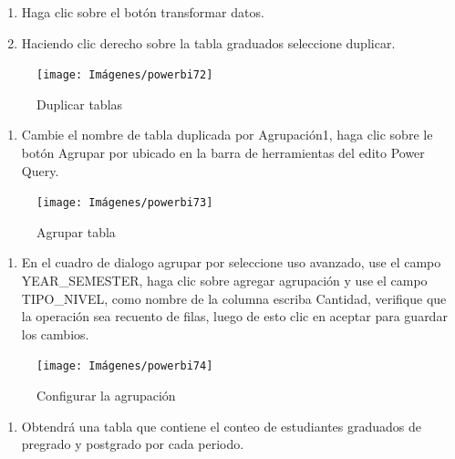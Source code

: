 \documentclass[
]{book}
\providecommand{\tightlist}{%
  \setlength{\itemsep}{0pt}\setlength{\parskip}{0pt}}
\begin{document}
\begin{enumerate}
\def\labelenumi{\arabic{enumi}.}
\item
  Haga clic sobre el botón transformar datos.
\item
  Haciendo clic derecho sobre la tabla graduados seleccione duplicar.
\end{enumerate}

\begin{figure}

{\centering \texttt{[image: Imágenes/powerbi72]} 

}

\caption{Duplicar tablas}\label{fig:paso2porcentajes-fig}
\end{figure}

\begin{enumerate}
\def\labelenumi{\arabic{enumi}.}
\setcounter{enumi}{2}
\tightlist
\item
  Cambie el nombre de tabla duplicada por Agrupación1, haga clic sobre le botón Agrupar por ubicado en la barra de herramientas del edito Power Query.
\end{enumerate}

\begin{figure}

{\centering \texttt{[image: Imágenes/powerbi73]} 

}

\caption{Agrupar tabla}\label{fig:paso3porcentajes-fig}
\end{figure}

\begin{enumerate}
\def\labelenumi{\arabic{enumi}.}
\setcounter{enumi}{3}
\tightlist
\item
  En el cuadro de dialogo agrupar por seleccione uso avanzado, use el campo YEAR\_SEMESTER, haga clic sobre agregar agrupación y use el campo TIPO\_NIVEL, como nombre de la columna escriba Cantidad, verifique que la operación sea recuento de filas, luego de esto clic en aceptar para guardar los cambios.
\end{enumerate}

\begin{figure}

{\centering \texttt{[image: Imágenes/powerbi74]} 

}

\caption{Configurar la agrupación}\label{fig:paso4porcentajes-fig}
\end{figure}

\begin{enumerate}
\def\labelenumi{\arabic{enumi}.}
\setcounter{enumi}{4}
\tightlist
\item
  Obtendrá una tabla que contiene el conteo de estudiantes graduados de pregrado y postgrado por cada periodo.
\end{enumerate}
\end{document}
